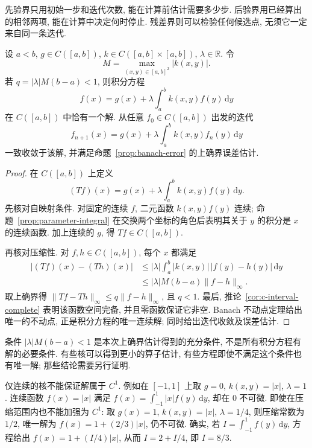 先验界只用初始一步和迭代次数, 能在计算前估计需要多少步. 后验界用已经算出的相邻两项, 能在计算中决定何时停止. 残差界则可以检验任何候选点, 无须它一定来自同一条迭代.


\begin{theorem}\label{thm:fredholm-contraction}
设 $a<b$, $g\in C([a,b])$, $k\in C([a,b]\times[a,b])$, $\lambda\in\mathbb R$. 令
\[
M=\max_{(x,y)\in[a,b]^2}|k(x,y)|.
\]
若 $q=|\lambda|M(b-a)<1$, 则积分方程
\[
f(x)=g(x)+\lambda\int_a^b k(x,y)f(y)\,\mathrm dy
\]
在 $C([a,b])$ 中恰有一个解. 从任意 $f_0\in C([a,b])$ 出发的迭代
\[
f_{n+1}(x)=g(x)+\lambda\int_a^b k(x,y)f_n(y)\,\mathrm dy
\]
一致收敛于该解, 并满足命题~\ref{prop:banach-error} 的上确界误差估计.
\end{theorem}
\begin{proof}
在 $C([a,b])$ 上定义
\[
(Tf)(x)=g(x)+\lambda\int_a^b k(x,y)f(y)\,\mathrm dy.
\]
先核对自映射条件. 对固定的连续 $f$, 二元函数 $k(x,y)f(y)$ 连续; 命题~\ref{prop:parameter-integral} 在交换两个坐标的角色后表明其关于 $y$ 的积分是 $x$ 的连续函数. 加上连续的 $g$, 得 $Tf\in C([a,b])$.

再核对压缩性. 对 $f,h\in C([a,b])$, 每个 $x$ 都满足
\begin{align*}
|(Tf)(x)-(Th)(x)|
&\leq|\lambda|\int_a^b|k(x,y)|\,|f(y)-h(y)|\,\mathrm dy\\
&\leq|\lambda|M(b-a)\|f-h\|_\infty.
\end{align*}
取上确界得 $\|Tf-Th\|_\infty\leq q\|f-h\|_\infty$, 且 $q<1$. 最后, 推论~\ref{cor:c-interval-complete} 表明该函数空间完备, 并且零函数保证它非空. Banach 不动点定理给出唯一的不动点, 正是积分方程的唯一连续解; 同时给出迭代收敛及误差估计.
\end{proof}

\begin{remark}
条件 $|\lambda|M(b-a)<1$ 是本次上确界估计得到的充分条件, 不是所有积分方程有解的必要条件. 有些核可以得到更小的算子估计, 有些方程即使不满足这个条件也有唯一解; 那些结论需要另行证明.

仅连续的核不能保证解属于 $C^1$. 例如在 $[-1,1]$ 上取 $g=0$, $k(x,y)=|x|$, $\lambda=1$. 连续函数 $f(x)=|x|$ 满足
$f(x)=\int_{-1}^1|x|f(y)\,\mathrm dy$, 却在 $0$ 不可微. 即使在压缩范围内也不能加强为 $C^1$: 取 $g(x)=1$, $k(x,y)=|x|$, $\lambda=1/4$, 则压缩常数为 $1/2$, 唯一解为 $f(x)=1+(2/3)|x|$, 仍不可微. 确实, 若 $I=\int_{-1}^1f(y)\,\mathrm dy$, 方程给出 $f(x)=1+(I/4)|x|$, 从而 $I=2+I/4$, 即 $I=8/3$.
\end{remark}


